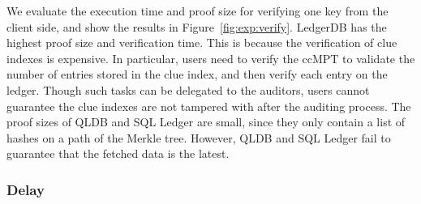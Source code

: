\documentclass[11pt,dvipdfm]{article}
\begin{document}
We evaluate the execution time and proof size for verifying one key from the client side, and show the results in Figure~\ref{fig:exp:verify}. LedgerDB has the highest proof size and verification time. This is because the verification of clue indexes is expensive. In particular, users need to verify the ccMPT to validate the number of entries stored in the clue index, and then verify each entry on the ledger. Though such tasks can be delegated to the auditors, users cannot guarantee the clue indexes are not tampered with after the auditing process. The proof sizes of QLDB and SQL Ledger are small, since they only contain a list of hashes on a path of the Merkle tree. However, QLDB and SQL Ledger fail to guarantee that the fetched data is the latest.


\subsubsection{Delay}
\end{document}
